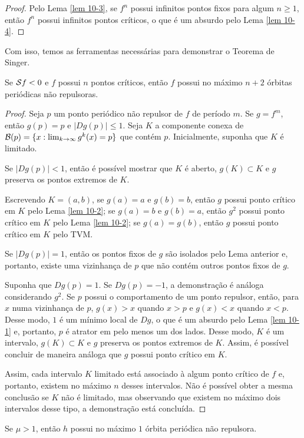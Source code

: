 \begin{proof}
Pelo Lema \ref{lem 10-3}, se $f^n$ possui infinitos pontos fixos para algum $n \geq 1$, então $f^n$ possui infinitos pontos críticos, o que é um absurdo pelo Lema \ref{lem 10-4}.
\end{proof}

Com isso, temos as ferramentas necessárias para demonstrar o Teorema de Singer.

\begin{theorem}[Singer]
Se $\mathcal{S} f < 0$ e $f$ possui $n$ pontos críticos, então $f$ possui no máximo $n+2$ órbitas periódicas não repulsoras.
\end{theorem}

\begin{proof}
Seja $p$ um ponto periódico não repulsor de $f$ de período $m$.
Se $g = f^m$, então $g(p) = p$ e $|D g(p)| \leq 1$.
Seja $K$ a componente conexa de $\mathcal{B}(p) = \lbrace x : \lim_{k \to \infty} g^k(x) = p \rbrace$ que contém $p$.
Inicialmente, suponha que $K$ é limitado.

Se $|D g(p)| < 1$, então é possível mostrar que $K$ é aberto, $g(K) \subset K$ e $g$ preserva os pontos extremos de $K$.

Escrevendo $K = (a, b)$, se $g(a) = a$ e $g(b) = b$, então $g$ possui ponto crítico em $K$ pelo Lema \ref{lem 10-2}; se $g(a) = b$ e $g(b) = a$, então $g^2$ possui ponto crítico em $K$ pelo Lema \ref{lem 10-2}; se $g(a) = g(b)$, então $g$ possui ponto crítico em $K$ pelo TVM.

Se $|D g(p)| = 1$, então os pontos fixos de $g$ são isolados pelo Lema anterior e, portanto, existe uma vizinhança de $p$ que não contém outros pontos fixos de $g$.

Suponha que $D g(p) = 1$.
Se $D g(p) = -1$, a demonstração é análoga considerando $g^2$.
Se $p$ possui o comportamento de um ponto repulsor, então, para $x$ numa vizinhança de $p$, $g(x) > x$ quando $x > p$ e $g(x) < x$ quando $x < p$.
Desse modo, $1$ é um mínimo local de $D g$, o que é um absurdo pelo Lema \ref{lem 10-1} e, portanto, $p$ é atrator em pelo menos um dos lados.
Desse modo, $K$ é um intervalo, $g(K) \subset K$ e $g$ preserva os pontos extremos de $K$.
Assim, é possível concluir de maneira análoga que $g$ possui ponto crítico em $K$.

Assim, cada intervalo $K$ limitado está associado à algum ponto crítico de $f$ e, portanto, existem no máximo $n$ desses intervalos.
Não é possível obter a mesma conclusão se $K$ não é limitado, mas observando que existem no máximo dois intervalos desse tipo, a demonstração está concluída.
\end{proof}

\begin{corollary}
Se $\mu > 1$, então $h$ possui no máximo $1$ órbita periódica não repulsora.
\end{corollary}
